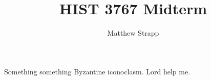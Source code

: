 \documentclass{article}
\title{HIST 3767 Midterm}
\author{Matthew Strapp}
\begin{document}
\begin{singlespace}
    \maketitle
\end{singlespace}
    Something something Byzantine iconoclasm. Lord help me.
\end{document}
